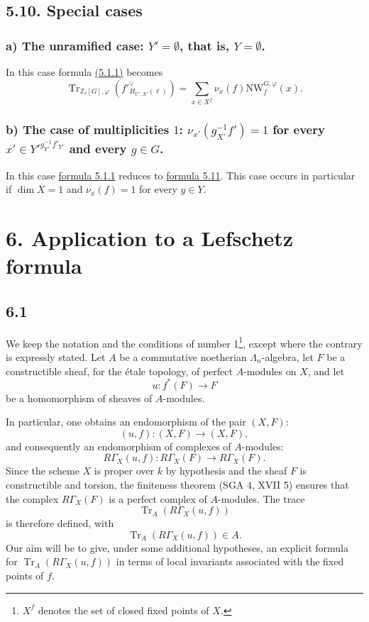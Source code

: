 \documentclass[11pt]{article}
\providecommand{\Tr}{\operatorname{Tr}}
\providecommand{\Tr}{\operatorname{Tr}}
\providecommand{\Tr}{\operatorname{Tr}}
\providecommand{\Tr}{\operatorname{Tr}}
\providecommand{\La}{\Lambda}
\providecommand{\bZ}{\mathbb Z}
\providecommand{\Tr}{\operatorname{Tr}}
\begin{document}
\subsection*{5.10. Special cases}\label{sga5:XII:subsection:5.10}
\subsubsection*{a) The unramified case: $Y'=\emptyset$, that is, $Y=\emptyset$.}
In this case formula \hyperref[sga5:XII:equation:5.1.1]{(5.1.1)} becomes
\begin{equation}\tag{5.11}\label{sga5:XII:equation:5.11}
\Tr_{\bZ_\ell[G],\varphi}(f'^\vee_{H_{U',X'}(\ell)})
=
\sum_{x\in X^f}\nu_x(f)\mathrm{NW}_f^{G,\varphi}(x).
\end{equation}

\subsubsection*{b) The case of multiplicities $1$: $\nu_{x'}(g_{X'}^{-1}f')=1$ for every $x'\in {Y'}^{g_{Y'}^{-1}f'_{Y'}}$ and every $g\in G$.}
In this case \hyperref[sga5:XII:equation:5.1.1]{formula 5.1.1} reduces to \hyperref[sga5:XII:equation:5.11]{formula 5.11}. This case occurs in particular if $\dim X=1$ and $\nu_x(f)=1$ for every $y\in Y$.

\section*{6. Application to a Lefschetz formula}\label{sga5:XII:section:6}

\subsection*{6.1}\label{sga5:XII:subsection:6.1}
We keep the notation and the conditions of number 1\footnote{$X^f$ denotes the set of closed fixed points of $X$.}, except where the contrary is expressly stated. Let $A$ be a commutative noetherian $\La_n$-algebra, let $F$ be a constructible sheaf, for the étale topology, of perfect $A$-modules on $X$, and let
\[
u:f^*(F)\longrightarrow F
\]
be a homomorphism of sheaves of $A$-modules.

In particular, one obtains an endomorphism of the pair $(X,F)$:
\[
(u,f):(X,F)\longrightarrow (X,F),
\]
and consequently an endomorphism of complexes of $A$-modules:
\[
R\Gamma_X(u,f):R\Gamma_X(F)\longrightarrow R\Gamma_X(F).
\]
Since the scheme $X$ is proper over $k$ by hypothesis and the sheaf $F$ is constructible and torsion, the finiteness theorem (SGA 4, XVII 5) ensures that the complex $R\Gamma_X(F)$ is a perfect complex of $A$-modules. The trace
\[
\Tr_A(R\Gamma_X(u,f))
\]
is therefore defined, with
\[
\Tr_A(R\Gamma_X(u,f))\in A.
\]
Our aim will be to give, under some additional hypotheses, an explicit formula for $\Tr_A(R\Gamma_X(u,f))$ in terms of local invariants associated with the fixed points of $f$.
\end{document}
